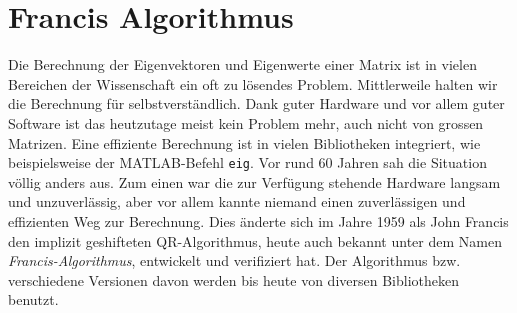 \newcommand{\norm}[1]{\left\lVert#1\right\rVert}


\chapter{Francis Algorithmus\label{chapter:francis}}

\begin{refsection}
{\parindent 0pt
Die} Berechnung der Eigenvektoren und Eigenwerte einer Matrix ist in vielen Bereichen der Wissenschaft ein oft zu lösendes Problem.
%
%
%
%
Mittlerweile halten wir die Berechnung für selbstverständlich.
Dank guter Hardware und vor allem guter Software ist das heutzutage meist kein Problem mehr, auch nicht von grossen Matrizen.
Eine effiziente Berechnung ist in vielen Bibliotheken integriert, wie beispielsweise der MATLAB-Befehl \texttt{eig}.
%
%
Vor rund 60 Jahren sah die Situation völlig anders aus.
Zum einen war die zur Verfügung stehende Hardware langsam und unzuverlässig, aber vor allem kannte niemand einen zuverlässigen und effizienten Weg zur Berechnung.
Dies änderte sich im Jahre 1959 als John Francis den implizit geshifteten QR-Algorithmus, heute auch bekannt unter dem Namen \emph{Francis-Algorithmus}, entwickelt und verifiziert hat.
%
%
Der Algorithmus bzw. verschiedene Versionen davon werden bis heute von diversen Bibliotheken benutzt. \cite{francis:watkins_paper}


\end{refsection}
